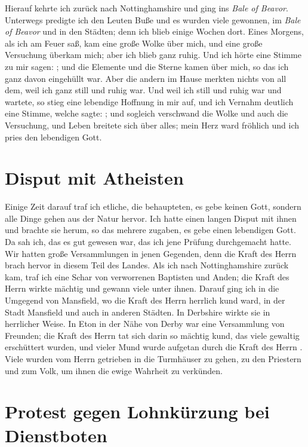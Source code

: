 Hierauf kehrte ich zurück nach Nottinghamshire und ging
ins \textit{Bale of Beavor}. Unterwegs predigte ich den Leuten Buße
und es wurden viele gewonnen, im \textit{Bale of Beavor} und in den
Städten; denn ich blieb einige Wochen dort. Eines Morgens,
als ich am Feuer saß, kam eine große Wolke über mich, und eine
große Versuchung überkam mich; aber ich 
blieb ganz ruhig. Und 
ich hörte eine Stimme zu mir sagen: ; und die Elemente und die Sterne kamen über
mich, so das ich ganz davon eingehüllt war. Aber die andern
im Hause merkten nichts von all dem, weil ich ganz still und
ruhig war. Und weil ich still und ruhig war und wartete, so
stieg eine lebendige Hoffnung in mir auf, und ich Vernahm deutlich
eine Stimme, welche sagte: ; und sogleich verschwand die Wolke
und auch die Versuchung, und Leben breitete sich über alles; mein
Herz ward fröhlich und ich pries den lebendigen Gott. 

\section{Disput mit Atheisten}

Einige
Zeit darauf traf ich etliche, die behaupteten, es gebe keinen Gott,
sondern alle Dinge gehen aus der Natur hervor.
 Ich hatte einen
langen Disput mit ihnen und brachte sie herum, so das mehrere
zugaben, es gebe einen lebendigen Gott. Da sah ich, das es gut
gewesen war, das ich jene Prüfung durchgemacht hatte. Wir
hatten große Versammlungen in jenen Gegenden, denn die Kraft
des Herrn  brach hervor in diesem Teil des Landes. Als ich nach
Nottinghamshire zurück kam, traf ich eine Schar von verworrenen
Baptisten und Anden; die Kraft des Herrn  
wirkte mächtig und
gewann viele unter ihnen. Darauf ging ich in die Umgegend von
Mansfield, wo die Kraft des Herrn  herrlich kund ward, in der
Stadt Mansfield und auch in anderen Städten. 
In Derbshire
wirkte sie in herrlicher Weise. In Eton in der Nähe von Derby
war eine Versammlung von Freunden; die Kraft des Herrn  tat sich
darin so mächtig kund, das viele gewaltig erschüttert wurden, und
vieler Mund wurde aufgetan durch die Kraft des Herrn . Viele wurden
vom Herrn  getrieben in die Turmhäuser zu gehen, zu den Priestern
und zum Volk, um ihnen die ewige Wahrheit zu verkünden.

\section{Protest gegen Lohnkürzung bei Dienstboten}

